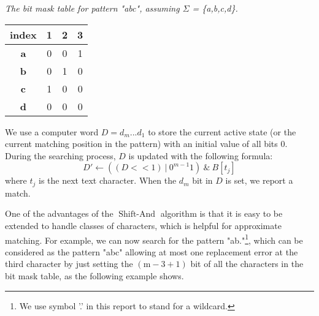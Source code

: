 \begin{example}\emph{The bit mask table for pattern "abc", assuming $\Sigma$ = \{a,b,c,d\}.}

\begin{table}[H]
	\centering
	\begin{tabular}{|c|c|c|c|}
		\hline
		index      & 1                        & 2                        & 3                        \\ \hline
		\textbf{a} & 0                        & 0                        & {\color[HTML]{3531FF} 1} \\ \hline
		\textbf{b} & 0                        & {\color[HTML]{3531FF} 1} & 0                        \\ \hline
		\textbf{c} & {\color[HTML]{3531FF} 1} & 0                        & 0                        \\ \hline
		\textbf{d} & 0                        & 0                        & 0                        \\ \hline
	\end{tabular}
	\label{table-bitmask}
\end{table}
\end{example}

We use a computer word $D = d_m...d_1$ to store the current active state (or the current matching position in the pattern) with an initial value of all bits 0. During the searching process, $D$ is updated with the following formula: 
$$D' \leftarrow ((D << 1) \ | \ 0^{m-1}1) \ \& \ B[t_j]$$
where $t_j$ is the next text character.  When the $d_m$ bit in $D$ is set, we report a match. 

One of the advantages of the $\operatorname{Shift-And}$ algorithm is that it is easy to be extended to handle classes of characters, which is helpful for approximate matching. 
For example, we can now search for the pattern "ab."\footnote{ We use symbol '.' in this report to stand for a wildcard.}, which can be considered as the pattern "abc" allowing at most one replacement error at the third character by just setting the $\operatorname{(m-3+1)}$ bit of all the characters in the bit mask table, as the following example shows. 

